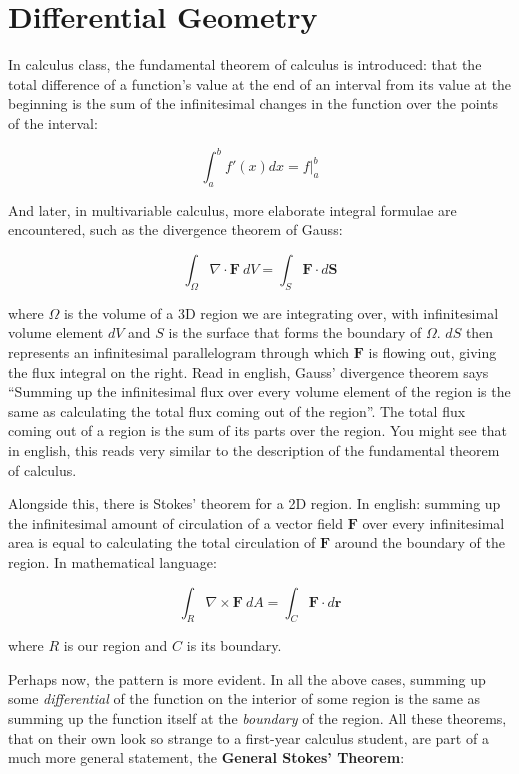 \documentclass[../master.tex]{subfiles}
\begin{document}
\chapter{Differential Geometry}

In calculus class, the fundamental theorem of calculus is introduced: that the total difference of a function's value at the end of an interval from its value at the beginning is the sum of the infinitesimal changes in the function over the points of the interval:

	\begin{equation}\label{eq:FTOC}
		\int_a^b f'(x) dx = f\Big\rvert^b_a
	\end{equation}

And later, in multivariable calculus, more elaborate integral formulae are encountered, such as the divergence theorem of Gauss:

	\begin{equation}\label{eq:Divergence}
		\int_\Omega \nabla \cdot \mathbf{F} ~ dV = \int_S \mathbf{F} \cdot d\mathbf S
	\end{equation}

	where $\Omega$ is the volume of a 3D region we are integrating over, with infinitesimal volume element $dV$ and $S$ is the surface that forms the boundary of $\Omega$. $dS$ then represents an infinitesimal parallelogram through which $\mathbf{F}$ is flowing out, giving the flux integral on the right. Read in english, Gauss' divergence theorem says ``Summing up the infinitesimal flux over every volume element of the region is the same as calculating the total flux coming out of the region''. The total flux coming out of a region is the sum of its parts over the region. You might see that in english, this reads very similar to the description of the fundamental theorem of calculus.
	
	Alongside this, there is Stokes' theorem for a 2D region. In english: summing up the infinitesimal amount of circulation of a vector field $\mathbf F$ over every infinitesimal area is equal to calculating the total circulation of $\mathbf F$ around the boundary of the region. In mathematical language:
	
	\begin{equation}\label{eq:Stokes}
		\int_R \nabla \times \mathbf{F} ~ dA = \int_C \mathbf{F} \cdot d\mathbf r
	\end{equation}
	
	where $R$ is our region and $C$ is its boundary.
	
	Perhaps now, the pattern is more evident. In all the above cases, summing up some \emph{differential} of the function on the interior of some region is the same as summing up the function itself at the \emph{boundary} of the region. All these theorems, that on their own look so strange to a first-year calculus student, are part of a much more general statement, the \textbf{General Stokes' Theorem}:
	
\end{document}
